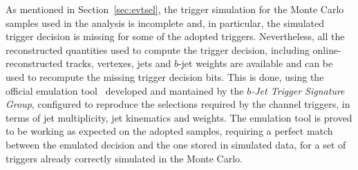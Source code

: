 As mentioned in Section~\ref{sec:evtsel}, the trigger simulation for the Monte Carlo samples used in the analysis is incomplete and, in particular, the simulated trigger decision is missing for some of the adopted triggers. 
Nevertheless, all the reconstructed quantities used to compute the trigger decision, 
including online-reconstructed tracks, vertexes, jets and $b$-jet weights are available
and can be used to recompute the missing trigger decision bits. 
This is done, using the official emulation tool~\cite{trigemu} developed and mantained 
by the \textit{$b$-Jet Trigger Signature Group}, configured to reproduce the selections required by the \twocentral channel triggers, in terms of jet multiplicity, jet kinematics and \btagging weights. The emulation tool is proved to be working as expected on the adopted samples, requiring a perfect match between the emulated decision and the one stored in simulated data, for a set of triggers already correctly simulated in the Monte Carlo.
